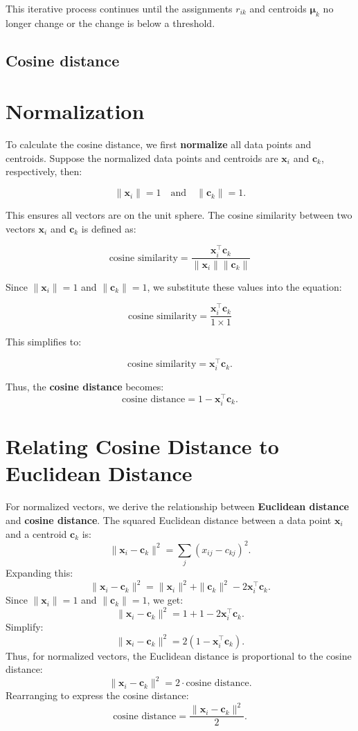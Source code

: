 This iterative process continues until the assignments \( r_{ik} \) and centroids \( \boldsymbol{\mu}_k \) no longer change or the change is below a threshold.

\subsection*{Cosine distance}

\section*{Normalization}

To calculate the cosine distance, we first \textbf{normalize} all data points and centroids. Suppose the normalized data points and centroids are \( \mathbf{x}_i \) and \( \mathbf{c}_k \), respectively, then:

\[
\|\mathbf{x}_i\| = 1 \quad \text{and} \quad \|\mathbf{c}_k\| = 1.
\]

This ensures all vectors are on the unit sphere. The cosine similarity between two vectors \( \mathbf{x}_i \) and \( \mathbf{c}_k \) is defined as:

\[
\text{cosine similarity} = \frac{\mathbf{x}_i^\top \mathbf{c}_k}{\|\mathbf{x}_i\| \|\mathbf{c}_k\|}
\]

Since \( \|\mathbf{x}_i\| = 1 \) and \( \|\mathbf{c}_k\| = 1 \), we substitute these values into the equation:

\[
\text{cosine similarity} = \frac{\mathbf{x}_i^\top \mathbf{c}_k}{1 \times 1}
\]

This simplifies to:

\[
\text{cosine similarity} = \mathbf{x}_i^\top \mathbf{c}_k.
\]

Thus, the \textbf{cosine distance} becomes:
\[
\text{cosine distance} = 1 - \mathbf{x}_i^\top \mathbf{c}_k.
\]



\section*{Relating Cosine Distance to Euclidean Distance}

For normalized vectors, we derive the relationship between \textbf{Euclidean distance} and \textbf{cosine distance}. The squared Euclidean distance between a data point \( \mathbf{x}_i \) and a centroid \( \mathbf{c}_k \) is:
\[
\|\mathbf{x}_i - \mathbf{c}_k\|^2 = \sum_{j} (x_{ij} - c_{kj})^2.
\]
Expanding this:
\[
\|\mathbf{x}_i - \mathbf{c}_k\|^2 = \|\mathbf{x}_i\|^2 + \|\mathbf{c}_k\|^2 - 2 \mathbf{x}_i^\top \mathbf{c}_k.
\]
Since \( \|\mathbf{x}_i\| = 1 \) and \( \|\mathbf{c}_k\| = 1 \), we get:
\[
\|\mathbf{x}_i - \mathbf{c}_k\|^2 = 1 + 1 - 2 \mathbf{x}_i^\top \mathbf{c}_k.
\]
Simplify:
\[
\|\mathbf{x}_i - \mathbf{c}_k\|^2 = 2(1 - \mathbf{x}_i^\top \mathbf{c}_k).
\]
Thus, for normalized vectors, the Euclidean distance is proportional to the cosine distance:
\[
\|\mathbf{x}_i - \mathbf{c}_k\|^2 = 2 \cdot \text{cosine distance}.
\]
Rearranging to express the cosine distance:
\[
\text{cosine distance} = \frac{\|\mathbf{x}_i - \mathbf{c}_k\|^2}{2}.
\]




